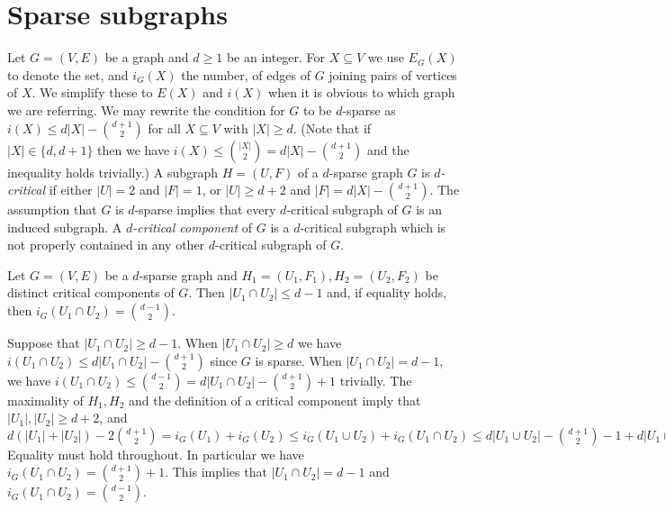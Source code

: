 \documentclass[11pt]{article}
\begin{document}
\section{Sparse subgraphs}
Let $G=(V,E)$ be a graph and $d\geq 1$ be an integer. For
$X\subseteq V$ we use $E_G(X)$ to denote the set, and $i_G(X)$ the
number, of edges of $G$ joining pairs of vertices of $X$. We
simplify these to $E(X)$ and $i(X)$ when it is obvious to which
graph we are referring. We may rewrite the condition for $G$ to be
{$d$-sparse} as $i(X)\leq d|X|-{{d+1}\choose{2}}$ for all
$X\subseteq V$ with $|X|\geq d$. (Note that if $|X|\in \{d,d+1\}$
then we have $i(X)\leq {{|X|}\choose{2}}=d|X|-{{d+1}\choose{2}}$ and
the inequality holds trivially.) A subgraph $H=(U,F)$ of a
$d$-sparse graph $G$ is {\em $d$-critical} if either $|U|=2$ and
$|F|=1$, or $|U|\geq d+2$ and $|F|=d|X|-{{d+1}\choose{2}}$. The
assumption that $G$ is $d$-sparse implies that every $d$-critical
subgraph of $G$ is an induced subgraph. A {\em $d$-critical
component} of $G$ is a $d$-critical subgraph which is not properly
contained in any other $d$-critical subgraph of $G$.

\begin{lemma}\label{int}
Let $G=(V,E)$ be a $d$-sparse graph and
$H_1=(U_1,F_1),H_2=(U_2,F_2)$ be distinct critical components of
$G$. Then $|U_1\cap U_2|\leq d-1$ and, if equality holds, then
$i_G(U_1\cap U_2)={{d-1}\choose{2}}$.
\end{lemma}
\bproof Suppose that $|U_1\cap U_2|\geq d-1$. When $|U_1\cap
U_2|\geq d$ we have $i(U_1\cap U_2)\leq d|U_1\cap
U_2|-{{d+1}\choose{2}}$ since $G$ is sparse. When $|U_1\cap
U_2|=d-1$, we have $i(U_1\cap U_2)\leq {{d-1}\choose{2}}=d|U_1\cap
U_2|-{{d+1}\choose{2}}+1$ trivially. The maximality of $H_1,H_2$ and
the definition of a critical component imply that $|U_1|,|U_2|\geq
d+2$, and $d(|U_1|+|U_2|)-2{{d+1}\choose{2}}= i_G(U_1)+i_G(U_2)\leq
i_G(U_1\cup U_2)+i_G(U_1\cap U_2) \leq d|U_1\cup
U_2|-{{d+1}\choose{2}}-1+d|U_1\cap
U_2|-{{d+1}\choose{2}}+1=d(|U_1|+|U_2|)-2{{d+1}\choose{2}}.$
Equality must hold throughout. In particular we have  $i_G(U_1\cap
U_2)={{d+1}\choose{2}}+1$. This implies that $|U_1\cap U_2|= d-1$
and $i_G(U_1\cap U_2)={{d-1}\choose{2}}$. \eproof
\end{document}
